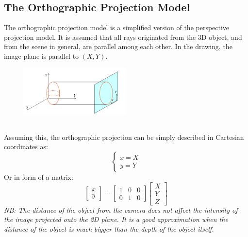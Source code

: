 \subsection{The Orthographic Projection Model}
The orthographic projection model is a simplified version of the perspective projection model. It is assumed that all rays originated from the 3D object, and from the scene in general, are parallel among each other. 
In the drawing, the image plane is parallel to $(X,Y)$.
\begin{figure}[h]
    \centering
    \includegraphics[width=0.5\textwidth]{Figures/Orthographic_proj.png}
\end{figure}
\\Assuming this, the orthographic projection
can be simply described in Cartesian coordinates as:
\[
    \begin{cases}
        x = X \\
        y = Y
    \end{cases}
\]
Or in form of a matrix:
\[
    \begin{bmatrix}
        x \\
        y
    \end{bmatrix} = \begin{bmatrix}
        1 & 0 & 0 \\
        0 & 1 & 0
    \end{bmatrix} \begin{bmatrix}
        X \\
        Y \\
        Z
    \end{bmatrix}   
\]
\textit{NB: The distance of the object from the camera does not affect the intensity of the image projected onto the 2D plane.
It is a good approximation when the distance of the object is much bigger than the depth of the object itself. }

